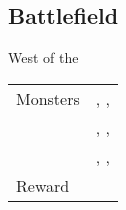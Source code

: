\subsection{Battlefield}
\label{map:battlefield_02}

West of the 

\noindent\begin{tabularx}{\textwidth}[l]{lX}
	Monsters
	& \nameref{monster:poison_toad}, \nameref{monster:poison_toad}, \nameref{monster:poison_toad} \\
	& \nameref{monster:poison_toad}, \nameref{monster:poison_toad}, \nameref{monster:basilisk} \\
	& \nameref{monster:poison_toad}, \nameref{monster:poison_toad}, \nameref{monster:mad_plant}
\\ \hline
	Reward & \nameref{armor:charm}
\end{tabularx}
